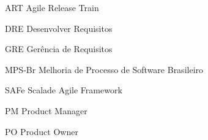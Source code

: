 \begin{siglas}
  \item[ART] Agile Release Train
  \item[DRE] Desenvolver Requisitos
  \item[GRE] Gerência de Requisitos
  \item[MPS-Br] Melhoria de Processo de Software Brasileiro
  \item[SAFe] Scalade Agile Framework
  \item[PM] Product Manager
  \item[PO] Product Owner
\end{siglas}

